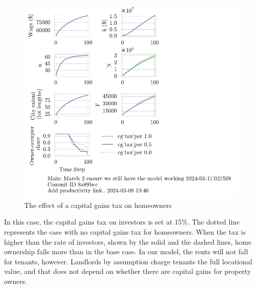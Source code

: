 \begin{figure}
    \centering
    \includegraphics[scale=.8, trim={0 1.4cm 0 0},clip]{fig/cg_tax_per-Main-021508.pdf}
    \caption{The effect of a capital gains tax on homeowners}
    \label{fig:CGpers_ownership_trajectory}
\end{figure}
In this case, the capital gains tax on investors is set at 15\%. The dotted line represents the case with no capital gains tax for homeowners. When the tax is higher than the rate of investors, shown by the solid and the dashed lines,  home ownership falls more than in the base case. In our model, the rents will not fall for tenants, however. Landlords by assumption charge tenants the full locational value, and that does not depend on whether there are capital gains for property owners.

\newpage

